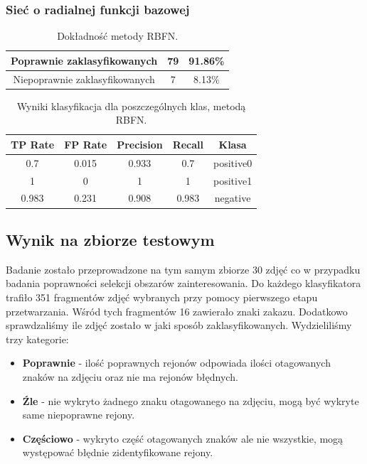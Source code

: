 \documentclass{classrep}
\begin{document}
\subsubsection{Sieć o radialnej funkcji bazowej}


\begin{table}[H]
\centering
\begin{tabular}{|c|c|c|}
\hline 
Poprawnie zaklasyfikowanych & 79 & 91.86\% \\ 
\hline 
Niepoprawnie zaklasyfikowanych & 7 & 8.13\% \\
\hline 
\end{tabular} 
\caption{Dokładność metody RBFN.}
\label{wyniki:rbfproc}
\end{table}



\begin{table}[H]
\centering
\begin{tabular}{|c|c|c|c|c|}
\hline 
TP Rate &  FP Rate &  Precision &  Recall &  Klasa\\
\hline
0.7    &   0.015  &    0.933  &   0.7 &    positive0\\
\hline
1      &   0     &     1   &      1   &    positive1\\
\hline
0.983  &   0.231   &   0.908  &   0.983  & negative\\
\hline 
\end{tabular} 

\caption{Wyniki klasyfikacja dla poszczególnych klas, metodą RBFN.}
\label{wyniki:rbfclass}
\end{table}

\subsection{Wynik na zbiorze testowym}
Badanie zostało przeprowadzone na tym samym zbiorze 30 zdjęć co w przypadku badania poprawności selekcji obszarów zainteresowania. Do każdego klasyfikatora trafiło 351 fragmentów zdjęć wybranych przy pomocy pierwszego etapu przetwarzania. Wśród tych fragmentów 16 zawierało znaki zakazu. Dodatkowo sprawdzaliśmy ile zdjęć zostało w jaki sposób zaklasyfikowanych. Wydzieliliśmy trzy kategorie:
\begin{itemize}
\item \textbf{Poprawnie} - ilość poprawnych rejonów odpowiada ilości otagowanych znaków na zdjęciu oraz nie ma rejonów błędnych.
\item \textbf{Źle} - nie wykryto żadnego znaku otagowanego na zdjęciu, mogą być wykryte same niepoprawne rejony.
\item \textbf{Częściowo} - wykryto część otagowanych znaków ale nie wszystkie, mogą występować błędnie zidentyfikowane rejony.
\end{itemize}
\end{document}
